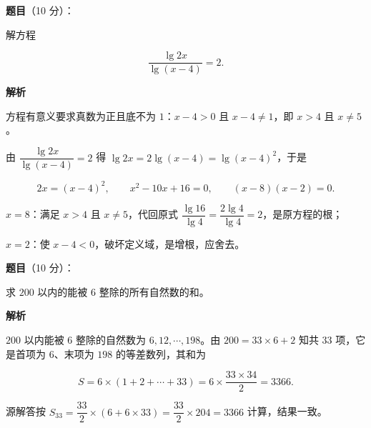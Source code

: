 \begin{answer}

\textbf{题目}（10 分）：

解方程

\nopagebreak[4]
\[
\frac{\lg 2x}{\lg (x-4)}=2.
\]

\textbf{解析}

方程有意义要求真数为正且底不为 $1$：$x-4>0$ 且 $x-4\ne 1$，即 $x>4$ 且 $x\ne 5$。

由 $\dfrac{\lg 2x}{\lg (x-4)}=2$ 得 $\lg 2x=2\lg (x-4)=\lg (x-4)^{2}$，于是

\nopagebreak[4]
\[
2x=(x-4)^{2},
\qquad
x^{2}-10x+16=0,
\qquad
(x-8)(x-2)=0.
\]

$x=8$：满足 $x>4$ 且 $x\ne 5$，代回原式 $\dfrac{\lg 16}{\lg 4}=\dfrac{2\lg 4}{\lg 4}=2$，是原方程的根；

$x=2$：使 $x-4<0$，破坏定义域，是增根，应舍去。


\end{answer}
\begin{answer}

\textbf{题目}（10 分）：

求 $200$ 以内的能被 $6$ 整除的所有自然数的和。

\textbf{解析}

$200$ 以内能被 $6$ 整除的自然数为 $6,12,\cdots,198$。由 $200=33\times 6+2$ 知共 $33$ 项，它是首项为 $6$、末项为 $198$ 的等差数列，其和为

\nopagebreak[4]
\[
S=6\times(1+2+\cdots+33)
=6\times\frac{33\times 34}{2}
=3366.
\]

源解答按 $S_{33}=\dfrac{33}{2}\times\left(6+6\times 33\right)=\dfrac{33}{2}\times 204=3366$ 计算，结果一致。


\end{answer}
